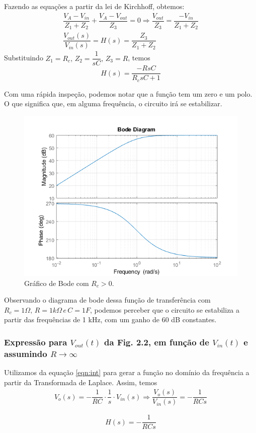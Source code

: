 Fazendo as equações a partir da lei de Kirchhoff, obtemos:
\begin{gather*}
	\dfrac{V_A - V_{in}}{Z_1 + Z_2} + \dfrac{V_A -V_{out}}{Z_3} = 0
	\Longrightarrow\dfrac{V_{out}}{Z_3} = \dfrac{-V_{in}}{Z_1 + Z_2}\\
	\dfrac{V_{out}(s)}{V_{in}(s)} = H(s) = \dfrac{Z_3}{Z_1 + Z_2} 
\end{gather*}
Substituindo $Z_1 = R_c, \, Z_2 = \dfrac{1}{sC}, \, Z_3 = R$, temos
\begin{equation}
	H(s) = \dfrac{-RsC}{R_c sC + 1}
\end{equation}

Com uma rápida inspeção, podemos notar que a função tem um zero e um polo. O que significa que, em alguma frequência, o circuito irá se estabilizar. 

\begin{figure}[H]
	\centering
	\includegraphics[width = .4\textwidth]{imagens/bode_plot_w_rc.png}
	\caption{Gráfico de Bode com $R_c>0$.}
\end{figure}

Observando o diagrama de bode dessa função de transferência com $R_c = 1\Omega, \, R = 1k\Omega \, e \, C = 1F$, podemos perceber que o circuito se estabiliza a partir das frequências de 1 kHz, com um ganho de 60 dB constantes. 

\subsubsection{Expressão para $V_{out}(t)$ da Fig. 2.2, em função de $V_{in}(t)$ e assumindo $R\rightarrow\infty$}

Utilizamos da equação \ref{eqn:int} para gerar a função no domínio da frequência a partir da Transformada de Laplace. Assim, temos
\begin{gather*}
	V_o(s) 	= -\dfrac{1}{RC} \cdot \dfrac{1}{s} \cdot V_{in}(s)
	\Longrightarrow \dfrac{V_o(s)}{V_{in}(s)} = -\dfrac{1}{RCs} 
\end{gather*}

\begin{equation}
	H(s)	=	 -\dfrac{1}{RCs}
\end{equation}

